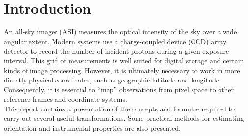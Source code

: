 \documentclass[11pt,twoside]{article}   %
\begin{document}
 \begin{titlepage} \begin{center}
%
 \vspace*{0.1cm}
%
 \end{center} \end{titlepage}

%
 \setcounter{tocdepth}{3}
 \tableofcontents \newpage

%
%
\section*{Introduction}
%
An all-sky imager (ASI) measures the optical intensity of the sky
over a wide angular extent.  Modern systems use a charge-coupled
device (CCD) array detector to record the number of incident
photons during a given exposure interval.  This grid of
measurements is well suited for digital storage and certain kinds
of image processing. However, it is ultimately necessary to work
in more directly physical coordinates, such as geographic latitude
and longitude. Consequently, it is essential to ``map''
observations from pixel space to other reference frames and
coordinate systems.
 \\[2ex]
\noindent This report contains a presentation of the concepts and
formulae required to carry out several useful transformations.
Some practical methods for estimating orientation and instrumental
properties are also presented.
 \\[2ex]
\end{document}
